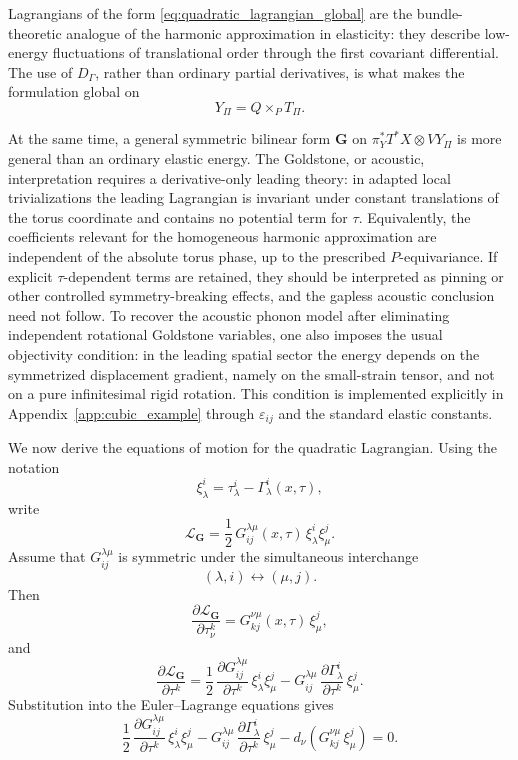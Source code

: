 \documentclass[11pt]{amsart}
\theoremstyle{plain}
\theoremstyle{definition}
\theoremstyle{remark}
\begin{document}
Lagrangians of the form \eqref{eq:quadratic_lagrangian_global} are the bundle-theoretic analogue of the harmonic approximation in elasticity: they describe low-energy fluctuations of translational order through the first covariant differential. 
The use of \(D_\Gamma\), rather than ordinary partial derivatives, is what makes the formulation global on
\[
Y_\Pi=Q\times_P T_\Pi.
\]

At the same time, a general symmetric bilinear form \(\mathbf G\) on \(\pi_Y^*T^*X\otimes VY_\Pi\) is more general than an ordinary elastic energy. 
The Goldstone, or acoustic, interpretation requires a derivative-only leading theory: in adapted local trivializations the leading Lagrangian is invariant under constant translations of the torus coordinate and contains no potential term for \(\tau\). 
Equivalently, the coefficients relevant for the homogeneous harmonic approximation are independent of the absolute torus phase, up to the prescribed \(P\)-equivariance. 
If explicit \(\tau\)-dependent terms are retained, they should be interpreted as pinning or other controlled symmetry-breaking effects, and the gapless acoustic conclusion need not follow. 
To recover the acoustic phonon model after eliminating independent rotational Goldstone variables, one also imposes the usual objectivity condition: in the leading spatial sector the energy depends on the symmetrized displacement gradient, namely on the small-strain tensor, and not on a pure infinitesimal rigid rotation. 
This condition is implemented explicitly in Appendix~\ref{app:cubic_example} through \(\varepsilon_{ij}\) and the standard elastic constants.

\medskip

We now derive the equations of motion for the quadratic Lagrangian. 
Using the notation
\[
\xi^i_\lambda=\tau^i_\lambda-\Gamma^i_\lambda(x,\tau),
\]
write
\begin{equation}
	\mathcal L_{\mathbf G}
	=
	\frac12\,G^{\lambda\mu}_{ij}(x,\tau)\,
	\xi^i_\lambda \xi^j_\mu .
	\label{eq:quadratic_density_xi}
\end{equation}
Assume that \(G^{\lambda\mu}_{ij}\) is symmetric under the simultaneous interchange
\[
(\lambda,i)\longleftrightarrow(\mu,j).
\]
Then
\begin{equation}
	\frac{\partial \mathcal L_{\mathbf G}}{\partial \tau^k_\nu}
	=
	G^{\nu\mu}_{kj}(x,\tau)\,\xi^j_\mu,
	\label{eq:quadratic_first_momentum}
\end{equation}
and
\begin{equation}
	\frac{\partial \mathcal L_{\mathbf G}}{\partial \tau^k}
	=
	\frac12\,
	\frac{\partial G^{\lambda\mu}_{ij}}{\partial \tau^k}\,
	\xi^i_\lambda \xi^j_\mu
	-
	G^{\lambda\mu}_{ij}\,
	\frac{\partial \Gamma^i_\lambda}{\partial \tau^k}\,
	\xi^j_\mu .
	\label{eq:quadratic_first_tau}
\end{equation}
Substitution into the Euler--Lagrange equations gives
\begin{equation}
	\frac12\,
	\frac{\partial G^{\lambda\mu}_{ij}}{\partial \tau^k}\,
	\xi^i_\lambda \xi^j_\mu
	-
	G^{\lambda\mu}_{ij}\,
	\frac{\partial \Gamma^i_\lambda}{\partial \tau^k}\,
	\xi^j_\mu
	-
	d_\nu\!\left(
	G^{\nu\mu}_{kj}\,\xi^j_\mu
	\right)
	=0.
	\label{eq:quadratic_EL_explicit}
\end{equation}
\end{document}
